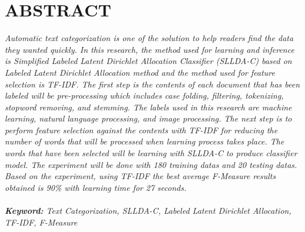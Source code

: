\chapter*{ABSTRACT}
\noindent
{\itshape Automatic text categorization is one of the solution to help readers find the data they wanted quickly. In this research, the method used for learning and inference is Simplified Labeled Latent Dirichlet Allocation Classifier (SLLDA-C) based on Labeled Latent Dirichlet Allocation method and the method used for feature selection is TF-IDF. The first step is the contents of each document that has been labeled will be pre-processing which includes case folding, filtering, tokenizing, stopword removing, and stemming. The labels used in this research are machine learning, natural language processing, and image processing. The next step is to perform feature selection against the contents with TF-IDF for reducing the number of words that will be processed when learning process takes place. The words that have been selected will be learning with SLLDA-C to produce classifier model. The experiment will be done with 180 training datas and 20 testing datas. Based on the experiment, using TF-IDF the best average F-Measure results obtained is 90\% with learning time for 27 seconds.
\\\\
\noindent \textbf{Keyword:} Text Categorization, SLLDA-C, Labeled Latent Dirichlet Allocation, TF-IDF, F-Measure}
\\